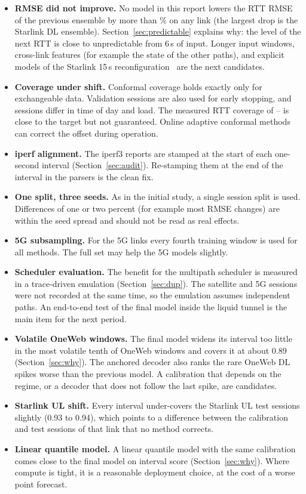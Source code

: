 \begin{itemize}[leftmargin=*]
  \item \textbf{RMSE did not improve.} No model in this report lowers the RTT RMSE of the previous ensemble by more than \MaxRMSEGain\% on any link (the largest drop is the Starlink DL ensemble). Section~\ref{sec:predictable} explains why: the level of the next RTT is close to unpredictable from 6\,s of input. Longer input windows, cross-link features (for example the state of the other paths), and explicit models of the Starlink 15\,s reconfiguration~\cite{tanveer2023making} are the next candidates.
  \item \textbf{Coverage under shift.} Conformal coverage holds exactly only for exchangeable data. Validation sessions are also used for early stopping, and sessions differ in time of day and load. The measured RTT coverage of \PICPMin--\PICPMax{} is close to the target but not guaranteed. Online adaptive conformal methods~\cite{gibbs2021adaptive} can correct the offset during operation.
  \item \textbf{iperf alignment.} The iperf3 reports are stamped at the start of each one-second interval (Section~\ref{sec:audit}). Re-stamping them at the end of the interval in the parsers is the clean fix.
  \item \textbf{One split, three seeds.} As in the initial study, a single session split is used. Differences of one or two percent (for example most RMSE changes) are within the seed spread and should not be read as real effects.
  \item \textbf{5G subsampling.} For the 5G links every fourth training window is used for all methods. The full set may help the 5G models slightly.
  \item \textbf{Scheduler evaluation.} The benefit for the multipath scheduler is measured in a trace-driven emulation (Section~\ref{sec:dup}). The satellite and 5G sessions were not recorded at the same time, so the emulation assumes independent paths. An end-to-end test of the final model inside the liquid tunnel is the main item for the next period.
  \item \textbf{Volatile OneWeb windows.} The final model widens its interval too little in the most volatile tenth of OneWeb windows and covers it at about 0.89 (Section~\ref{sec:why}). The anchored decoder also ranks the rare OneWeb DL spikes worse than the previous model. A calibration that depends on the regime, or a decoder that does not follow the last spike, are candidates.
  \item \textbf{Starlink UL shift.} Every interval under-covers the Starlink UL test sessions slightly (0.93 to 0.94), which points to a difference between the calibration and test sessions of that link that no method corrects.
  \item \textbf{Linear quantile model.} A linear quantile model with the same calibration comes close to the final model on interval score (Section~\ref{sec:why}). Where compute is tight, it is a reasonable deployment choice, at the cost of a worse point forecast.
\end{itemize}
